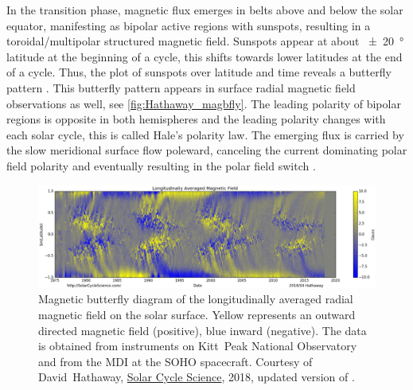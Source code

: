 In the transition phase, magnetic flux emerges in belts above and below the solar equator, manifesting as bipolar active regions with sunspots, resulting in a toroidal/multipolar structured magnetic field. Sunspots appear at about \SI{+-20}{\degree} latitude at the beginning of a cycle, this shifts towards lower latitudes at the end of a cycle. Thus, the plot of sunspots over latitude and time reveals a butterfly pattern \citep{Maunder1904}. This butterfly pattern appears in surface radial magnetic field observations as well, see \autoref{fig:Hathaway_magbfly}. The leading polarity of bipolar regions is opposite in both hemispheres and the leading polarity changes with each solar cycle, this is called Hale's polarity law. The emerging flux is carried by the slow meridional surface flow poleward, canceling the current dominating polar field polarity and eventually resulting in the polar field switch \citep{Hathaway2015}.
\begin{figure}[htb]
	\centering
	\includegraphics[width=\textwidth]{figures_of_others/images/Hathaway_magbfly_201804_cropped.png}
	\caption[Courtesy of David~Hathaway, \href{http://solarcyclescience.com/solarcycle.html}{Solar Cycle Science}, 2018, updated version of {\citet[Fig.~17]{Hathaway2015}}.]
	{Magnetic butterfly diagram of the longitudinally averaged radial magnetic field on the solar surface. Yellow represents an outward directed magnetic field (positive), blue inward (negative). The data is obtained from instruments on Kitt~Peak National Observatory and from the MDI at the SOHO spacecraft. Courtesy of David~Hathaway, \href{http://solarcyclescience.com/solarcycle.html}{Solar Cycle Science}, 2018, updated version of \citet[Fig.~17]{Hathaway2015}.}
	\label{fig:Hathaway_magbfly}
\end{figure}

